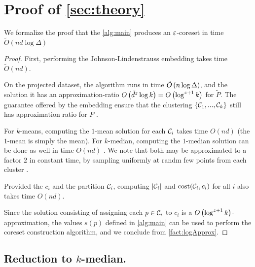 \section{Proof of \cref{sec:theory}}\label{app:theory}

We formalize the proof that the \cref{alg:main} produces an $\varepsilon$-coreset in time $\tilde O(nd \log \Delta)$
\begin{proof}
First, performing the Johnson-Lindenstrauss embedding takes time $\tilde O(nd)$.

On the projected dataset, the algorithm \fkmeans runs in time $\tilde O\left( n \log \Delta\right)$, and the solution it has an approximation-ratio $O\left( \tilde{d}^z \log k\right) = O\left(\log^{z+1} k\right)$ for $\tilde P$. 
The guarantee offered by the embedding ensure that the clustering $\left\{ \mathcal C_1,...,\mathcal C_k\right\}$ still has approximation ratio for $P$ \cite{makarychev2019performance}. 

For $k$-means, computing the $1$-mean solution for each $\mathcal C_i$ takes time $O(nd)$ (the $1$-mean is simply the mean). 
For $k$-median, computing the $1$-median solution can be done as well in time $O(nd)$ \cite{CohenLMPS16}. 
We note that both may be approximated to a factor $2$ in constant time, by sampling uniformly at randm few points from each cluster \cite{neurips21}.

Provided the $c_i$ and the partition $\mathcal C_i$, computing $|\mathcal C_i|$ and $\operatorname{cost}(\mathcal C_i, c_i)$ for all $i$ also takes time $O(nd)$.

Since the solution consisting of assigning each $p \in \mathcal C_i$ to $c_i$ is a $O\left( \log^{z+1} k\right)$-approximation, the values $s(p)$ defined in \cref{alg:main} can be used to perform the coreset construction algorithm, and we conclude from \cref{fact:logApprox}.
\end{proof}


\subsection{Reduction to $k$-median.}
\label{app:redKM}

